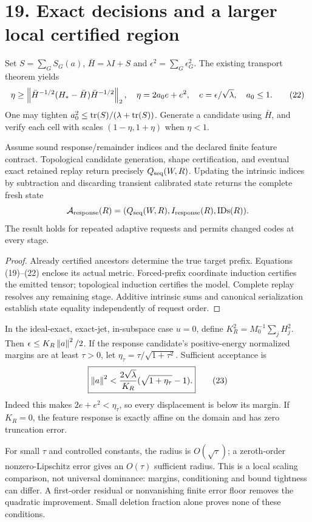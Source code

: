 \newpage
\section*{19. Exact decisions and a larger local certified region}
Set $S=\sum_GS_G(a)$, $\bar H=\lambda I+S$ and $\epsilon^2=\sum_G\epsilon_G^2$. The existing transport theorem yields
\[
 \eta\geq\left\|\bar H^{-1/2}(H_*-\bar H)\bar H^{-1/2}\right\|_2,
 \quad \eta=2a_0e+e^2,\quad e=\epsilon/\sqrt\lambda,\quad a_0\leq1. \tag{22}
\]
One may tighten $a_0^2\leq\operatorname{tr}(S)/(\lambda+\operatorname{tr}(S))$. Generate a candidate using $\bar H$, and verify each cell with scales $(1-\eta,1+\eta)$ when $\eta<1$.

\begin{theorem}
Assume sound response/remainder indices and the declared finite feature contract. Topological candidate generation, shape certification, and eventual exact retained replay return precisely $Q_{\rm seq}(W,R)$. Updating the intrinsic indices by subtraction and discarding transient calibrated state returns the complete fresh state
\[
 \mathcal A_{\rm response}(R)=(Q_{\rm seq}(W,R),I_{\rm response}(R),\mathrm{IDs}(R)).
\]
The result holds for repeated adaptive requests and permits changed codes at every stage.
\end{theorem}
\begin{proof}
Already certified ancestors determine the true target prefix. Equations (19)--(22) enclose its actual metric. Forced-prefix coordinate induction certifies the emitted tensor; topological induction certifies the model. Complete replay resolves any remaining stage. Additive intrinsic sums and canonical serialization establish state equality independently of request order.
\end{proof}

 In the ideal-exact, exact-jet, in-subspace case $u=0$, define $K_R^2=M_0^{-1}\sum_jH_j^2$. Then $\epsilon\leq K_R\left\|a\right\|^2/2$. If the response candidate's positive-energy normalized margins are at least $\tau>0$, let $\eta_\tau=\tau/\sqrt{1+\tau^2}$. Sufficient acceptance is
\[
 \boxed{\left\|a\right\|^2<\frac{2\sqrt\lambda}{K_R}
                    (\sqrt{1+\eta_\tau}-1).} \tag{23}
\]
Indeed this makes $2e+e^2<\eta_\tau$, so every displacement is below its margin. If $K_R=0$, the feature response is exactly affine on the domain and has zero truncation error.

For small $\tau$ and controlled constants, the radius is $O(\sqrt\tau)$; a zeroth-order nonzero-Lipschitz error gives an $O(\tau)$ sufficient radius. This is a local scaling comparison, not universal dominance: margins, conditioning and bound tightness can differ. A first-order residual or nonvanishing finite error floor removes the quadratic improvement. Small deletion fraction alone proves none of these conditions.

